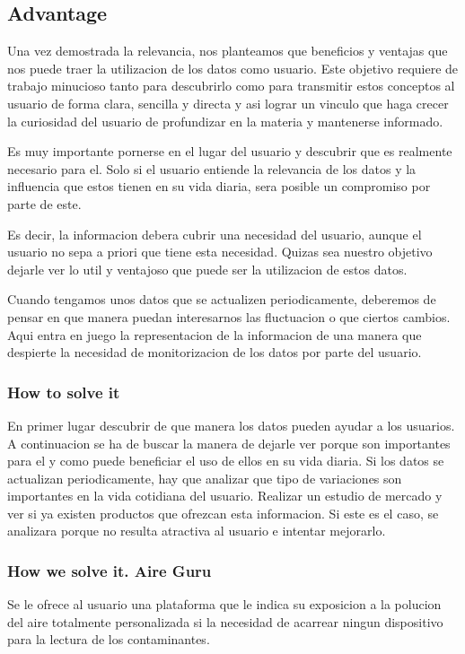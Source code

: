 \subsection{Advantage}
Una vez demostrada la relevancia, nos planteamos que beneficios y ventajas que nos puede traer la utilizacion de los datos como usuario. 
Este objetivo requiere de trabajo minucioso tanto para descubrirlo como para transmitir estos conceptos al usuario de forma clara, 
sencilla y directa y asi lograr un vinculo que haga crecer la curiosidad del usuario de profundizar en la materia y
mantenerse informado.

Es muy importante pornerse en el lugar del usuario y descubrir que es realmente necesario para el. Solo si el usuario entiende la relevancia de 
los datos y la influencia que estos tienen en su vida diaria, sera posible un compromiso por parte de este.

Es decir, la informacion debera cubrir una necesidad del usuario, aunque el usuario no sepa a priori que tiene esta necesidad. Quizas sea 
nuestro objetivo dejarle ver lo util y ventajoso que puede ser la utilizacion de estos datos.

Cuando tengamos unos datos que se actualizen periodicamente, deberemos de pensar en que manera puedan interesarnos las fluctuacion o que ciertos
cambios. Aqui entra en juego la representacion de la informacion de una manera que despierte la necesidad de monitorizacion de los datos por parte
del usuario.

\subsubsection{How to solve it} 
En primer lugar descubrir de que manera los datos pueden ayudar a los usuarios. A continuacion se ha de buscar la manera de dejarle ver
porque son importantes para el y como puede beneficiar el uso de ellos en su vida diaria.
Si los datos se actualizan periodicamente, hay que analizar que tipo de variaciones son importantes en la vida cotidiana del usuario.
Realizar un estudio de mercado y ver si ya existen productos que ofrezcan esta informacion. Si este es el caso, se analizara porque no
resulta atractiva al usuario e intentar mejorarlo.

\subsubsection{How we solve it. Aire Guru} 
Se le ofrece al usuario una plataforma que le indica su exposicion a la polucion del aire totalmente personalizada si la necesidad de acarrear
ningun dispositivo para la lectura de los contaminantes.




